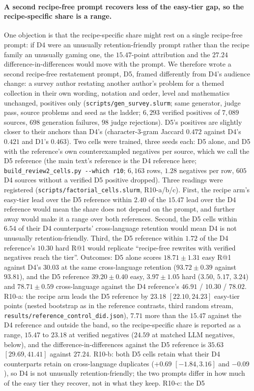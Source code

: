 \paragraph{A second recipe-free prompt recovers less of the easy-tier gap, so the recipe-specific share is a range.}
One objection is that the recipe-specific share might rest on a single recipe-free prompt: if D4 were an unusually retention-friendly prompt rather than the recipe family an unusually gaming one, the $15.47$-point attribution and the $27.24$ difference-in-differences would move with the prompt. We therefore wrote a second recipe-free restatement prompt, D5, framed differently from D4's audience change: a survey author restating another author's problem for a themed collection in their own wording, notation and order, level and mathematics unchanged, positives only (\texttt{scripts/gen\_survey.slurm}; same generator, judge pass, source problems and seed as the ladder; $6{,}293$ verified positives of $7{,}089$ sources, $698$ generation failures, $98$ judge rejections). D5's positives are slightly closer to their anchors than D4's (character-$3$-gram Jaccard $0.472$ against D4's $0.421$ and D1's $0.463$). Two cells were trained, three seeds each: D5 alone, and D5 with the reference's own counterexampled negatives per source, which we call the D5 reference (the main text's reference is the D4 reference here; \texttt{build\_review2\_cells.py -{}-which r10}; $6{,}163$ rows, $1.28$ negatives per row, $605$ D4 sources without a verified D5 positive dropped). Three readings were registered (\texttt{scripts/factorial\_cells.slurm}, R10-a/b/c). First, the recipe arm's easy-tier lead over the D5 reference within $2.40$ of the $15.47$ lead over the D4 reference would mean the share does not depend on the prompt, and further away would make it a range over both references. Second, the D5 cells within $6.54$ of their D4 counterparts' cross-language retention would mean D4 is not unusually retention-friendly. Third, the D5 reference within $1.72$ of the D4 reference's $10.30$ hard R@1 would replicate ``recipe-free rewrites with verified negatives reach the tier''. Outcomes: D5 alone scores $18.71 \pm 1.31$ easy R@1 against D4's $30.03$ at the same cross-language retention ($93.72 \pm 0.39$ against $93.81$), and the D5 reference $39.20 \pm 0.40$ easy, $3.97 \pm 1.05$ hard ($3.50$, $5.17$, $3.24$) and $78.71 \pm 0.59$ cross-language against the D4 reference's $46.91$ / $10.30$ / $78.02$. R10-a: the recipe arm leads the D5 reference by $23.18$ $[22.10, 24.23]$ easy-tier points (nested bootstrap as in the reference contrasts, third random stream, \texttt{results/reference\_control\_did.json}), $7.71$ more than the $15.47$ against the D4 reference and outside the band, so the recipe-specific share is reported as a range, $15.47$ to $23.18$ at verified negatives ($24.59$ at matched LLM negatives, below), and the difference-in-differences against the D5 reference is $35.63$ $[29.69, 41.41]$ against $27.24$. R10-b: both D5 cells retain what their D4 counterparts retain on cross-language duplicates ($+0.69$ $[-1.84, 3.16]$ and $-0.09$), so D4 is not unusually retention-friendly; the two prompts differ in how much of the easy tier they recover, not in what they keep. R10-c: the D5 